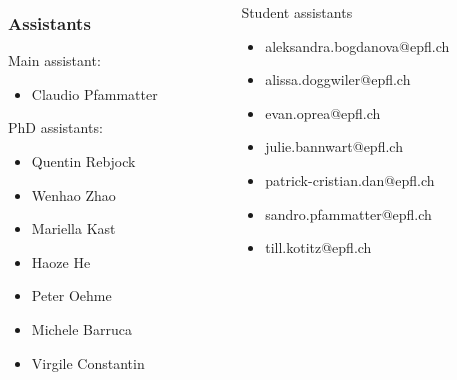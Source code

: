 \documentclass[t,aspectratio=149,mathserif]{beamer}
\begin{document}
   \begin{frame}

     \begin{columns}
       \begin{column}{0.4\textwidth }                 
     \frametitle{Assistants}
     Main assistant:
     \begin{itemize}
     \item Claudio Pfammatter 
     \end{itemize}
     
     PhD assistants:
     \begin{itemize}
     \item Quentin Rebjock
     \item Wenhao Zhao
     \item Mariella Kast \item Haoze He \item  Peter Oehme \item Michele Barruca  \item Virgile Constantin
     \end{itemize}
   \end{column}
   \begin{column}{0.6\textwidth }         
     Student assistants     
     \begin{itemize}
     \item aleksandra.bogdanova@epfl.ch \item 
       alissa.doggwiler@epfl.ch \item 
       evan.oprea@epfl.ch \item 
       julie.bannwart@epfl.ch \item 
       patrick-cristian.dan@epfl.ch \item 
       sandro.pfammatter@epfl.ch \item 
       till.kotitz@epfl.ch 
     \end{itemize}
   \end{column}
   
\end{columns}
\end{frame}
\end{document}
